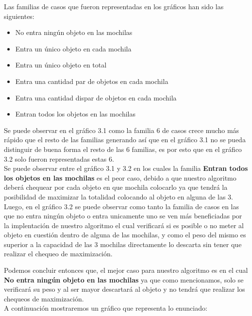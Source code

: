 Las familias de casos que fueron representadas en los gr\'aficos han sido las siguientes:\\
\begin{itemize}
\item No entra ning\'un objeto en las mochilas
\item Entra un \'unico objeto en cada mochila
\item Entra un \'unico objeto en total
\item Entra una cantidad par de objetos en cada mochila
\item Entra una cantidad dispar de objetos en cada mochila
\item Entran todos los objetos en las mochilas
\end{itemize}

Se puede observar en el gr\'afico 3.1 como la familia 6 de casos crece mucho m\'as r\'apido que el resto de las familias generando as\'i que en el gr\'afico 3.1 no se pueda distinguir de buena forma el resto de las 6 familias, es por esto que en el gr\'afico 3.2 solo fueron representadas estas 6.\\

Se puede observar entre el gr\'afico 3.1 y 3.2 en los cuales la familia \textbf{Entran todos los objetos en las mochilas} es el peor caso, debido a que nuestro algoritmo deber\'a chequear por cada objeto en que mochila colocarlo ya que tendr\'a la posibilidad de maximizar la totalidad colocando al objeto en alguna de las 3.\\

Luego, en el gr\'afico 3.2 se puede observar como tanto la familia de casos en las que no entra ning\'un objeto o entra unicamente uno se ven m\'as beneficiadas por la implentaci\'on de nuestro algoritmo el cual verificar\'a si es posible o no meter al objeto en cuesti\'on dentro de alguna de las mochilas, y como el peso del mismo es superior a la capacidad de las 3 mochilas directamente lo descarta sin tener que realizar el chequeo de maximizaci\'on.

Podemos concluir entonces que, el mejor caso para nuestro algoritmo es en el cual \textbf{No entra ning\'un objeto en las mochilas} ya que como mencionamos, solo se verificar\'a su peso y al ser mayor descartar\'a al objeto y no tendr\'a que realizar los chequeos de maximizaci\'on.\\

A continuaci\'on mostraremos un gr\'afico que representa lo enunciado:

